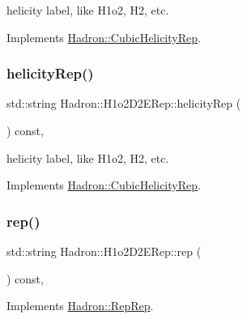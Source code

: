 helicity label, like H1o2, H2, etc. 

Implements \mbox{\hyperlink{structHadron_1_1CubicHelicityRep_af1096946b7470edf0a55451cc662f231}{Hadron\+::\+Cubic\+Helicity\+Rep}}.

\mbox{\label{structHadron_1_1H1o2D2ERep_a8c9ee9d587a013968ba36b769ddccfc3}} 
\subsubsection{\texorpdfstring{helicityRep()}{helicityRep()}\hspace{0.1cm}{\footnotesize\ttfamily [2/2]}}
{\footnotesize\ttfamily std\+::string Hadron\+::\+H1o2\+D2\+E\+Rep\+::helicity\+Rep (\begin{DoxyParamCaption}{ }\end{DoxyParamCaption}) const\hspace{0.3cm}{\ttfamily [inline]}, {\ttfamily [virtual]}}

helicity label, like H1o2, H2, etc. 

Implements \mbox{\hyperlink{structHadron_1_1CubicHelicityRep_af1096946b7470edf0a55451cc662f231}{Hadron\+::\+Cubic\+Helicity\+Rep}}.

\mbox{\label{structHadron_1_1H1o2D2ERep_ac801e3e5c50b7740398e08b907cae155}} 
\subsubsection{\texorpdfstring{rep()}{rep()}\hspace{0.1cm}{\footnotesize\ttfamily [1/3]}}
{\footnotesize\ttfamily std\+::string Hadron\+::\+H1o2\+D2\+E\+Rep\+::rep (\begin{DoxyParamCaption}{ }\end{DoxyParamCaption}) const\hspace{0.3cm}{\ttfamily [inline]}, {\ttfamily [virtual]}}



Implements \mbox{\hyperlink{structHadron_1_1RepRep_ab3213025f6de249f7095892109575fde}{Hadron\+::\+Rep\+Rep}}.

\mbox{\label{structHadron_1_1H1o2D2ERep_ac801e3e5c50b7740398e08b907cae155}} 
